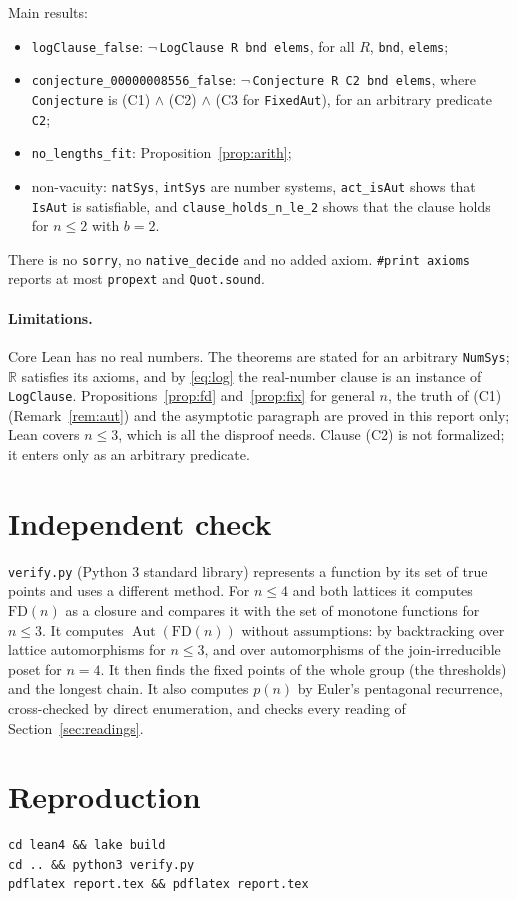 \documentclass[11pt]{article}
\theoremstyle{definition}
\theoremstyle{remark}
\newcommand{\FD}{\mathrm{FD}}
\newcommand{\Aut}{\operatorname{Aut}}
\newcommand{\R}{\mathbb{R}}
\begin{document}
Main results:
\begin{itemize}
\item \texttt{logClause\_false}: $\neg$\,\texttt{LogClause R bnd elems}, for all $R$, \texttt{bnd}, \texttt{elems};
\item \texttt{conjecture\_00000008556\_false}: $\neg$\,\texttt{Conjecture R C2 bnd elems}, where
\texttt{Conjecture} is (C1) $\wedge$ (C2) $\wedge$ (C3 for \texttt{FixedAut}), for an
arbitrary predicate \texttt{C2};
\item \texttt{no\_lengths\_fit}: Proposition~\ref{prop:arith};
\item non-vacuity: \texttt{natSys}, \texttt{intSys} are number systems,
\texttt{act\_isAut} shows that \texttt{IsAut} is satisfiable, and
\texttt{clause\_holds\_n\_le\_2} shows that the clause holds for $n\le2$ with $b=2$.
\end{itemize}
There is no \texttt{sorry}, no \texttt{native\_decide} and no added axiom.
\texttt{\#print axioms} reports at most \texttt{propext} and \texttt{Quot.sound}.

\paragraph{Limitations.} Core Lean has no real numbers. The theorems are stated
for an arbitrary \texttt{NumSys}; $\R$ satisfies its axioms, and by
\eqref{eq:log} the real-number clause is an instance of \texttt{LogClause}.
Propositions~\ref{prop:fd} and~\ref{prop:fix} for general $n$, the truth of (C1)
(Remark~\ref{rem:aut}) and the asymptotic paragraph are proved in this report
only; Lean covers $n\le3$, which is all the disproof needs. Clause (C2) is not
formalized; it enters only as an arbitrary predicate.

\section{Independent check}
\texttt{verify.py} (Python 3 standard library) represents a function by its set
of true points and uses a different method. For $n\le4$ and both lattices it
computes $\FD(n)$ as a closure and compares it with the set of monotone functions
for $n\le3$. It computes $\Aut(\FD(n))$ without assumptions: by backtracking
over lattice automorphisms for $n\le3$, and over automorphisms of the
join-irreducible poset for $n=4$. It then finds the fixed points of the whole
group (the thresholds) and the longest chain. It also computes $p(n)$ by Euler's
pentagonal recurrence, cross-checked by direct enumeration, and checks every
reading of Section~\ref{sec:readings}.

\section{Reproduction}
\begin{verbatim}
cd lean4 && lake build
cd .. && python3 verify.py
pdflatex report.tex && pdflatex report.tex
\end{verbatim}
\end{document}
